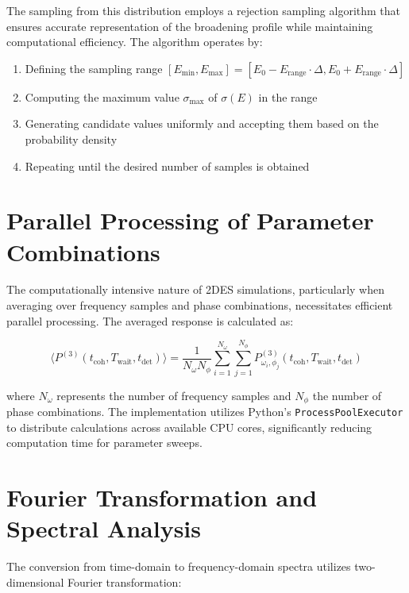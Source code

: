 \noindent
The sampling from this distribution employs a rejection sampling algorithm that ensures accurate representation of the broadening profile while maintaining computational efficiency. The algorithm operates by:

\begin{enumerate}
	\item Defining the sampling range $[E_{\text{min}}, E_{\text{max}}] = [E_0 - E_{\text{range}} \cdot \Delta, E_0 + E_{\text{range}} \cdot \Delta]$
	\item Computing the maximum value $\sigma_{\text{max}}$ of $\sigma(E)$ in the range
	\item Generating candidate values uniformly and accepting them based on the probability density
	\item Repeating until the desired number of samples is obtained
\end{enumerate}

\section{Parallel Processing of Parameter Combinations}
\label{sec:parallel_processing}

\noindent
The computationally intensive nature of 2DES simulations, particularly when averaging over frequency samples and phase combinations, necessitates efficient parallel processing. The averaged response is calculated as:

\begin{equation}
	\label{eq:averaged_response}
	\langle P^{(3)}(t_{\text{coh}}, T_{\text{wait}}, t_{\text{det}}) \rangle = \frac{1}{N_\omega N_\phi} \sum_{i=1}^{N_\omega} \sum_{j=1}^{N_\phi} P^{(3)}_{\omega_i, \phi_j}(t_{\text{coh}}, T_{\text{wait}}, t_{\text{det}})
\end{equation}

\noindent
where $N_\omega$ represents the number of frequency samples and $N_\phi$ the number of phase combinations. The implementation utilizes Python's \texttt{ProcessPoolExecutor} to distribute calculations across available CPU cores, significantly reducing computation time for parameter sweeps.

\section{Fourier Transformation and Spectral Analysis}
\label{sec:fourier_transformation}

The conversion from time-domain to frequency-domain spectra utilizes two-dimensional Fourier transformation:

